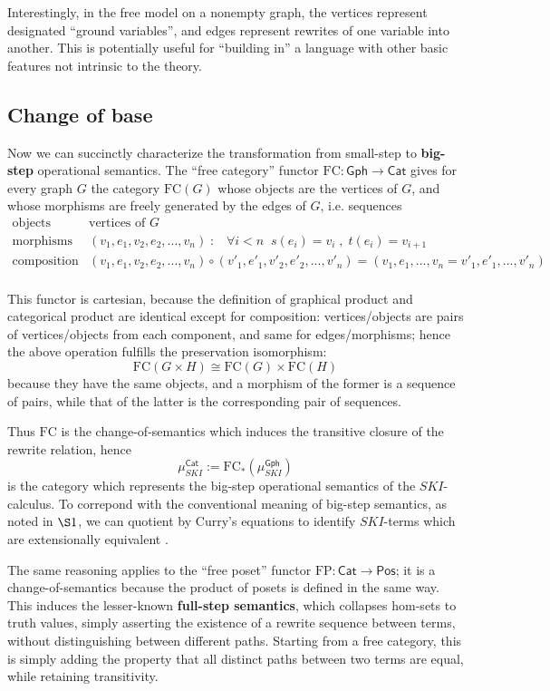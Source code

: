 \documentclass{amsart}
\theoremstyle{definition}
\newcommand{\Gph}{\mathsf{Gph}}
\newcommand{\Cat}{\mathsf{Cat}}
\newcommand{\Pos}{\mathsf{Pos}}
\newcommand{\FC}{\mathrm{FC}}
\newcommand{\FP}{\mathrm{FP}}
\newcommand{\maps}{\colon}
\begin{document}
Interestingly, in the free model on a nonempty graph, the vertices represent designated ``ground variables'', and edges represent rewrites of one variable into another. This is potentially useful for ``building in'' a language with other basic features not intrinsic to the theory.

\subsection{Change of base}
Now we can succinctly characterize the transformation from small-step to \textbf{big-step} operational semantics. The ``free category'' functor $\FC\maps \Gph \to \Cat$ gives for every graph $G$ the category $\FC(G)$ whose objects are the vertices of $G$, and whose morphisms are freely generated by the edges of $G$, i.e. sequences 
\[\begin{array}{rl}
\text{objects} & \text{vertices of } G\\
\text{morphisms} & (v_1,e_1,v_2,e_2,...,v_n) \; : \; \;\; \forall i<n \;\; s(e_i)=v_i \; , \; t(e_i)=v_{i+1}\\
\text{composition} & (v_1,e_1,v_2,e_2,...,v_n) \circ (v'_1,e'_1,v'_2,e'_2,...,v'_n) = (v_1,e_1,...,v_n=v'_1,e'_1,...,v'_n)\\
\end{array}\]

This functor is cartesian, because the definition of graphical product and categorical product are identical except for composition: vertices/objects are pairs of vertices/objects from each component, and same for edges/morphisms; hence the above operation fulfills the preservation isomorphism: $$\FC(G\times H) \cong \FC(G)\times \FC(H)$$ because they have the same objects, and a morphism of the former is a sequence of pairs, while that of the latter is the corresponding pair of sequences.

Thus $\FC$ is the change-of-semantics which induces the transitive closure of the rewrite relation, hence $$\mu_{SKI}^\Cat := \FC_*(\mu_{SKI}^\Gph)$$ is the category which represents the big-step operational semantics of the $SKI$-calculus. To correpond with the conventional meaning of big-step semantics, as noted in $\S1$, we can quotient by Curry's equations to identify $SKI$-terms which are extensionally equivalent \cite{barendregt}.

The same reasoning applies to the ``free poset'' functor $\FP\maps \Cat \to \Pos$; it is a change-of-semantics because the product of posets is defined in the same way. This induces the lesser-known \textbf{full-step semantics}, which collapses hom-sets to truth values, simply asserting the existence of a rewrite sequence between terms, without distinguishing between different paths. Starting from a free category, this is simply adding the property that all distinct paths between two terms are equal, while retaining transitivity.
\end{document}
